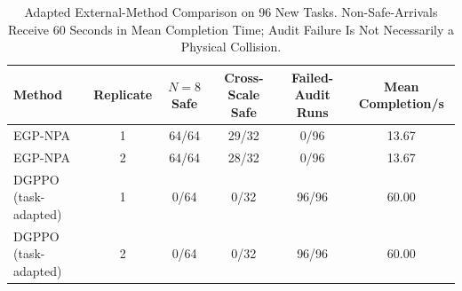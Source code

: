 \begin{table}[t]
\centering\footnotesize
\caption{Adapted External-Method Comparison on 96 New Tasks. Non-Safe-Arrivals Receive 60 Seconds in Mean Completion Time; Audit Failure Is Not Necessarily a Physical Collision.}\label{tab:external}
\begin{tabularx}{\textwidth}{@{}Xccccc@{}}\toprule
Method & Replicate & $N=8$ Safe & Cross-Scale Safe & Failed-Audit Runs & Mean Completion/s\\\midrule
EGP-NPA & 1 & 64/64 & 29/32 & 0/96 & 13.67 \\
EGP-NPA & 2 & 64/64 & 28/32 & 0/96 & 13.67 \\
DGPPO (task-adapted) & 1 & 0/64 & 0/32 & 96/96 & 60.00 \\
DGPPO (task-adapted) & 2 & 0/64 & 0/32 & 96/96 & 60.00 \\
\bottomrule\end{tabularx}
\end{table}
